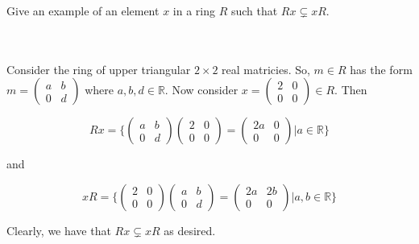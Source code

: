 Give an example of an element $x$ in a ring $R$ such that $Rx\subsetneq xR$.\\\\

\begin{solution}\renewcommand{\qedsymbol}{}\ \\
    Consider the ring of upper triangular $2\times2$ real matricies. So, $m\in R$ has the form
    $m=\left(\begin{array}{cc} a & b \\ 0 & d \end{array}\right)$ where $a,b,d\in\mathbb{R}$. Now
    consider $x=\left(\begin{array}{cc} 2 & 0 \\ 0 & 0 \end{array}\right)\in R$. Then

    $$Rx=\{\left(\begin{array}{cc} a & b \\ 0 & d \end{array}\right)
    \left(\begin{array}{cc} 2 & 0 \\ 0 & 0 \end{array}\right)
    =\left(\begin{array}{cc} 2a & 0 \\ 0 & 0 \end{array}\right)|a\in\mathbb{R}\}$$
    
    and

    $$xR=\{\left(\begin{array}{cc} 2 & 0 \\ 0 & 0 \end{array}\right)
    \left(\begin{array}{cc} a & b \\ 0 & d \end{array}\right)=
    \left(\begin{array}{cc} 2a & 2b \\ 0 & 0 \end{array}\right)|a,b\in\mathbb{R}\}$$
    
    Clearly, we have that $Rx\subsetneq xR$ as desired.

\end{solution}